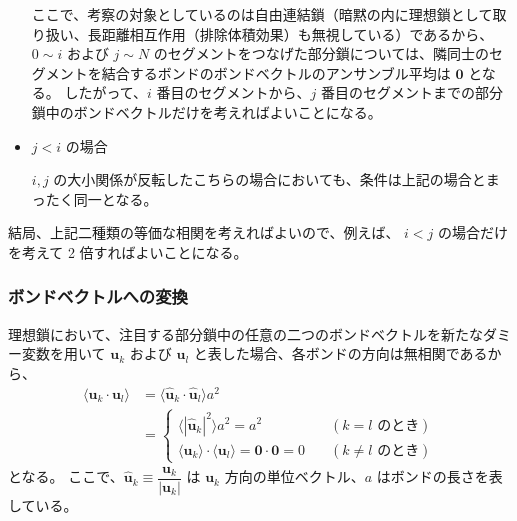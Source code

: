 \documentclass[a4paper,11pt]{ltjsarticle}
\begin{document}
\begin{appendix}
\begin{itemize}
ここで、考察の対象としているのは自由連結鎖（暗黙の内に理想鎖として取り扱い、長距離相互作用（排除体積効果）も無視している）であるから、$0 \sim i$ および $j \sim N$ のセグメントをつなげた部分鎖については、隣同士のセグメントを結合するボンドのボンドベクトルのアンサンブル平均は $\bm{0}$ となる。
したがって、$i$ 番目のセグメントから、$j$ 番目のセグメントまでの部分鎖中のボンドベクトルだけを考えればよいことになる。

\item
$j < i$ の場合


$i,j$ の大小関係が反転したこちらの場合においても、条件は上記の場合とまったく同一となる。
\end{itemize}

結局、上記二種類の等価な相関を考えればよいので、例えば、 $i < j$ の場合だけを考えて 2 倍すればよいことになる。

\subsubsection{ボンドベクトルへの変換}

理想鎖において、注目する部分鎖中の任意の二つのボンドベクトルを新たなダミー変数を用いて $\bm{u}_k$ および $\bm{u}_l$ と表した場合、各ボンドの方向は無相関であるから、
\begin{align*}
\langle \bm{u}_k \cdot \bm{u}_l \rangle 
	&= \langle \bm{\hat{u}}_k \cdot \bm{\hat{u}}_l \rangle a^2 \\
	&=
\begin{cases}
\langle |\bm{\hat{u}}_k |^2 \rangle a^2 = a^2	&\quad (\text{$k = l$ のとき}) \\
\langle \bm{u}_k \rangle \cdot \langle \bm{u}_l \rangle = \bm{0}\cdot\bm{0} = 0	&\quad(\text{$k \neq l$ のとき})
\end{cases}
\end{align*}
となる。
ここで、$\bm{\hat{u}}_k \equiv \dfrac{\bm{u}_k}{|\bm{u}_k|}$ は $\bm{u}_k$ 方向の単位ベクトル、$a$ はボンドの長さを表している。


\end{appendix}
\end{document}

